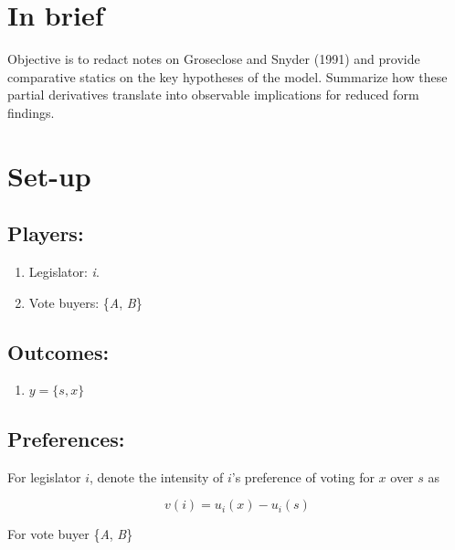 \documentclass[a4paper,12pt]{article}
\begin{document}
\section{In brief}
Objective is to redact notes on Groseclose and Snyder (1991) and provide comparative statics on the key hypotheses of the model. Summarize how these partial derivatives translate into observable implications for reduced form findings.

\section{Set-up}

\subsection*{Players:}
\begin{enumerate}
    \item Legislator: \textit{i}.
    \item Vote buyers: \{\textit{A}, \textit{B}\}
\end{enumerate}

\subsection*{Outcomes:}
\begin{enumerate}
    \item $y = \{s, x\}$
\end{enumerate}

\subsection*{Preferences:}
For legislator $i$, denote the intensity of $i$'s preference of voting for $x$ over $s$ as 

$$v(i) = u_i(x) - u_i(s)$$

For vote buyer \{\textit{A}, \textit{B}\}
\end{document}
